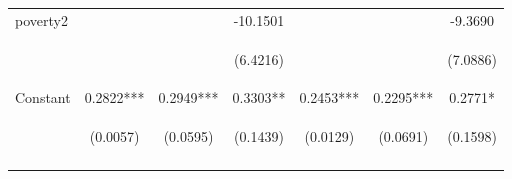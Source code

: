\begin{center}
\begin{tabular}{lcccccc}
poverty2 &  &  & -10.1501 &  &  & -9.3690 \\
\vspace{4pt} & \begin{footnotesize}\end{footnotesize} & \begin{footnotesize}\end{footnotesize} & \begin{footnotesize}(6.4216)\end{footnotesize} & \begin{footnotesize}\end{footnotesize} & \begin{footnotesize}\end{footnotesize} & \begin{footnotesize}(7.0886)\end{footnotesize} \\
Constant & 0.2822*** & 0.2949*** & 0.3303** & 0.2453*** & 0.2295*** & 0.2771* \\
 & \begin{footnotesize}(0.0057)\end{footnotesize} & \begin{footnotesize}(0.0595)\end{footnotesize} & \begin{footnotesize}(0.1439)\end{footnotesize} & \begin{footnotesize}(0.0129)\end{footnotesize} & \begin{footnotesize}(0.0691)\end{footnotesize} & \begin{footnotesize}(0.1598)\end{footnotesize} \\
\vspace{4pt} & \begin{footnotesize}\end{footnotesize} & \begin{footnotesize}\end{footnotesize} & \begin{footnotesize}\end{footnotesize} & \begin{footnotesize}\end{footnotesize} & \begin{footnotesize}\end{footnotesize} & \begin{footnotesize}\end{footnotesize} \\

\end{tabular}
\end{center}
